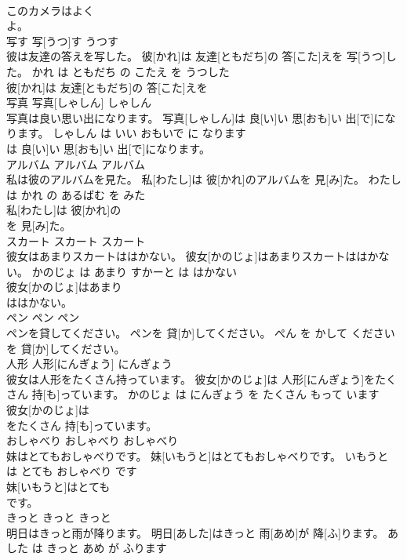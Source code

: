 \documentclass[8pt]{extreport}
\begin{document}
\begin{CJK}{UTF8}{min}
\\	このカメラはよく
\\	よ。			
\\	写す	写[うつ]す	うつす	
\\	彼は友達の答えを写した。	彼[かれ]は 友達[ともだち]の 答[こた]えを 写[うつ]した。	かれ は ともだち の こたえ を うつした	
\\	彼[かれ]は 友達[ともだち]の 答[こた]えを
\\	写真	写真[しゃしん]	しゃしん	
\\	写真は良い思い出になります。	写真[しゃしん]は 良[い]い 思[おも]い 出[で]になります。	しゃしん は いい おもいで に なります	
\\	は 良[い]い 思[おも]い 出[で]になります。			
\\	アルバム	アルバム	アルバム	
\\	私は彼のアルバムを見た。	私[わたし]は 彼[かれ]のアルバムを 見[み]た。	わたし は かれ の あるばむ を みた	
\\	私[わたし]は 彼[かれ]の
\\	を 見[み]た。			
\\	スカート	スカート	スカート	
\\	彼女はあまりスカートははかない。	彼女[かのじょ]はあまりスカートははかない。	かのじょ は あまり すかーと は はかない	
\\	彼女[かのじょ]はあまり
\\	ははかない。			
\\	ペン	ペン	ペン	
\\	ペンを貸してください。	ペンを 貸[か]してください。	ぺん を かして ください	
\\	を 貸[か]してください。			
\\	人形	人形[にんぎょう]	にんぎょう	
\\	彼女は人形をたくさん持っています。	彼女[かのじょ]は 人形[にんぎょう]をたくさん 持[も]っています。	かのじょ は にんぎょう を たくさん もって います	
\\	彼女[かのじょ]は
\\	をたくさん 持[も]っています。			
\\	おしゃべり	おしゃべり	おしゃべり	
\\	妹はとてもおしゃべりです。	妹[いもうと]はとてもおしゃべりです。	いもうと は とても おしゃべり です	
\\	妹[いもうと]はとても
\\	です。			
\\	きっと	きっと	きっと	
\\	明日はきっと雨が降ります。	明日[あした]はきっと 雨[あめ]が 降[ふ]ります。	あした は きっと あめ が ふります	

\end{CJK}
\end{document}
